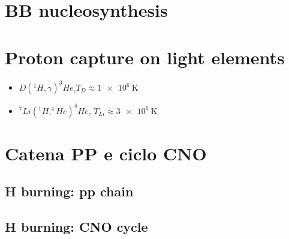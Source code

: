 \chapter{BB nucleosynthesis}
\PartialToc

\chapter{Proton capture on light elements}

\begin{itemize}
\item $D(^1H,\gamma)^3He$,$T_D\approx \SI{1e6}{\kelvin}$
\item $^7Li(^1H,^4He)^4He$, $T_{Li}\approx\SI{3e6}{\kelvin}$ 

\end{itemize}

\chapter{Catena PP e ciclo CNO}
\PartialToc

\section{H burning: pp chain}

\section{H burning: CNO cycle}
